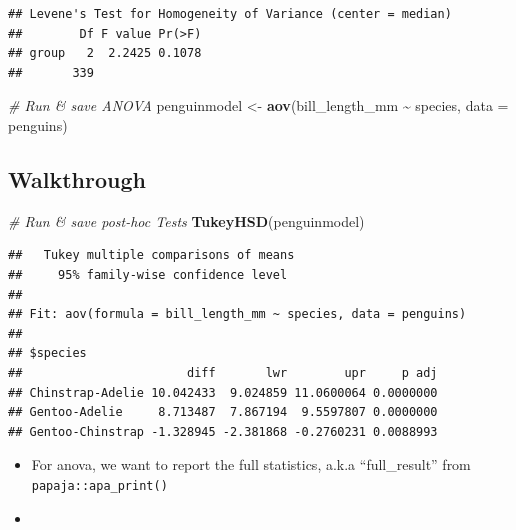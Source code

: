 \documentclass[
]{book}
\newenvironment{Shaded}{\begin{snugshade}}{\end{snugshade}}
\newcommand{\AttributeTok}[1]{\textcolor[rgb]{0.13,0.29,0.53}{#1}}
\newcommand{\CommentTok}[1]{\textcolor[rgb]{0.56,0.35,0.01}{\textit{#1}}}
\newcommand{\FunctionTok}[1]{\textcolor[rgb]{0.13,0.29,0.53}{\textbf{#1}}}
\newcommand{\NormalTok}[1]{#1}
\newcommand{\OtherTok}[1]{\textcolor[rgb]{0.56,0.35,0.01}{#1}}
\newcommand{\SpecialCharTok}[1]{\textcolor[rgb]{0.81,0.36,0.00}{\textbf{#1}}}
\begin{document}
\begin{verbatim}
## Levene's Test for Homogeneity of Variance (center = median)
##        Df F value Pr(>F)
## group   2  2.2425 0.1078
##       339
\end{verbatim}

\begin{Shaded}
\begin{Highlighting}[]
\CommentTok{\# Run \& save ANOVA}
\NormalTok{penguinmodel }\OtherTok{\textless{}{-}} \FunctionTok{aov}\NormalTok{(bill\_length\_mm }\SpecialCharTok{\textasciitilde{}}\NormalTok{ species, }\AttributeTok{data =}\NormalTok{ penguins)}
\end{Highlighting}
\end{Shaded}

\subsection{Walkthrough}\label{walkthrough-1}

\begin{Shaded}
\begin{Highlighting}[]
\CommentTok{\# Run \& save post{-}hoc Tests}
\FunctionTok{TukeyHSD}\NormalTok{(penguinmodel)}
\end{Highlighting}
\end{Shaded}

\begin{verbatim}
##   Tukey multiple comparisons of means
##     95% family-wise confidence level
## 
## Fit: aov(formula = bill_length_mm ~ species, data = penguins)
## 
## $species
##                       diff       lwr        upr     p adj
## Chinstrap-Adelie 10.042433  9.024859 11.0600064 0.0000000
## Gentoo-Adelie     8.713487  7.867194  9.5597807 0.0000000
## Gentoo-Chinstrap -1.328945 -2.381868 -0.2760231 0.0088993
\end{verbatim}

\begin{itemize}
\item
  For anova, we want to report the full statistics, a.k.a ``full\_result'' from \texttt{papaja::apa\_print()}
\item
\begin{Shaded}
\end{Shaded}
\end{itemize}
\end{document}
